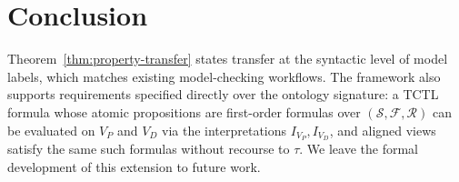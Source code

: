 \section{Conclusion}


Theorem~\ref{thm:property-transfer} states transfer at the syntactic
level of model labels, which matches existing model-checking
workflows. The framework also supports requirements specified
directly over the ontology signature: a TCTL formula whose atomic
propositions are first-order formulas over $(\mathcal{S},
\mathcal{F}, \mathcal{R})$ can be evaluated on $V_P$ and $V_D$ via
the interpretations $I_{V_P}, I_{V_D}$, and aligned views satisfy the
same such formulas without recourse to $\tau$. We leave the formal
development of this extension to future work.